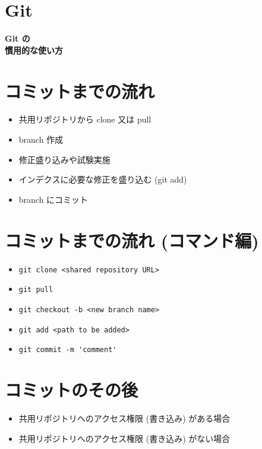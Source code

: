 \documentclass[slide,papersize]{jsarticle}
\begin{document}
\section*{Git}
\vspace*{13mm}
\begin{center}
{\Huge {\bf Git の\\慣用的な使い方}}
\end{center}

\section*{コミットまでの流れ}
\bigskip
\begin{itemize}
\item 共用リポジトリから clone 又は pull
\bigskip
\item branch 作成
\bigskip
\item 修正盛り込みや試験実施
\bigskip
\item インデクスに必要な修正を盛り込む (git add)
\bigskip
\item branch にコミット
\end{itemize}

\section*{コミットまでの流れ (コマンド編)}
\bigskip
\begin{itemize}
\item \begin{verbatim}git clone <shared repository URL>\end{verbatim}
\medskip
\item \begin{verbatim}git pull\end{verbatim}
\medskip
\item \begin{verbatim}git checkout -b <new branch name>\end{verbatim}
\medskip
\item \begin{verbatim}git add <path to be added>\end{verbatim}
\medskip
\item \begin{verbatim}git commit -m 'comment'\end{verbatim}
\end{itemize}

\section*{コミットのその後}
\bigskip
\begin{itemize}
\item 共用リポジトリへのアクセス権限 (書き込み) がある場合
\bigskip
\item 共用リポジトリへのアクセス権限 (書き込み) がない場合
\end{itemize}
\end{document}

